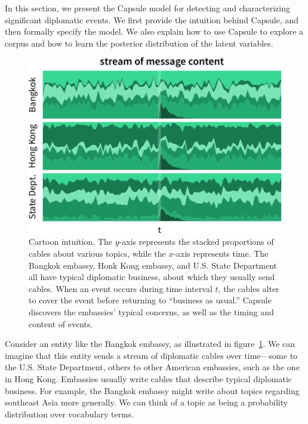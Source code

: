 
In this section, we present the Capsule model for detecting and
characterizing significant diplomatic events. We first provide the
intuition behind Capsule, and then formally specify the model. We also
explain how to use Capsule to explore a corpus and how to learn the
posterior distribution of the latent variables.

\begin{figure}
\centering
\includegraphics[width=\linewidth]{fig/cartoon.pdf}
\caption{Cartoon intuition. The $y$-axis represents the stacked
  proportions of cables about various topics, while the $x$-axis
  represents time. The Bangkok embassy, Honk Kong embassy, and
  U.S. State Department all have typical diplomatic business, about
  which they usually send cables. When an event occurs during time
  interval $t$, the cables alter to cover the event before returning
  to ``business as usual.'' Capsule discovers the embassies' typical
  concerns, as well as the timing and content of events.}
\label{fig:cartoon}
\end{figure}

Consider an entity like the Bangkok embassy, as illustrated in
figure~\ref{fig:cartoon}. We can imagine that this entity sends a
stream of diplomatic cables over time---some to the U.S. State
Department, others to other American embassies, such as the one in
Hong Kong. Embassies usually write cables that describe typical
diplomatic business. For example, the Bangkok embassy might write
about topics regarding southeast Asia more generally. We can think of
a topic as being a probability distribution over vocabulary terms.

